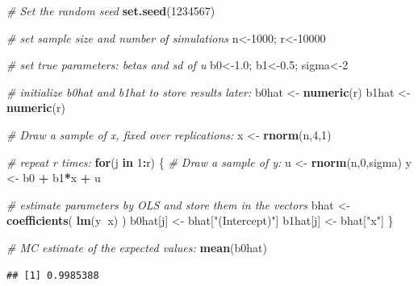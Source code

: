 \documentclass[]{book}
\newenvironment{Shaded}{\begin{snugshade}}{\end{snugshade}}
\newcommand{\CommentTok}[1]{\textcolor[rgb]{0.56,0.35,0.01}{\textit{#1}}}
\newcommand{\ControlFlowTok}[1]{\textcolor[rgb]{0.13,0.29,0.53}{\textbf{#1}}}
\newcommand{\DecValTok}[1]{\textcolor[rgb]{0.00,0.00,0.81}{#1}}
\newcommand{\FloatTok}[1]{\textcolor[rgb]{0.00,0.00,0.81}{#1}}
\newcommand{\KeywordTok}[1]{\textcolor[rgb]{0.13,0.29,0.53}{\textbf{#1}}}
\newcommand{\NormalTok}[1]{#1}
\newcommand{\OperatorTok}[1]{\textcolor[rgb]{0.81,0.36,0.00}{\textbf{#1}}}
\newcommand{\StringTok}[1]{\textcolor[rgb]{0.31,0.60,0.02}{#1}}
\begin{document}
\begin{Shaded}
\begin{Highlighting}[]
\CommentTok{# Set the random seed}
\KeywordTok{set.seed}\NormalTok{(}\DecValTok{1234567}\NormalTok{)}

\CommentTok{# set sample size and number of simulations}
\NormalTok{n<-}\DecValTok{1000}\NormalTok{; r<-}\DecValTok{10000}

\CommentTok{# set true parameters: betas and sd of u}
\NormalTok{b0<-}\FloatTok{1.0}\NormalTok{; b1<-}\FloatTok{0.5}\NormalTok{; sigma<-}\DecValTok{2}

\CommentTok{# initialize b0hat and b1hat to store results later:}
\NormalTok{b0hat <-}\StringTok{ }\KeywordTok{numeric}\NormalTok{(r)}
\NormalTok{b1hat <-}\StringTok{ }\KeywordTok{numeric}\NormalTok{(r)}

\CommentTok{# Draw a sample of x, fixed over replications:}
\NormalTok{x <-}\StringTok{ }\KeywordTok{rnorm}\NormalTok{(n,}\DecValTok{4}\NormalTok{,}\DecValTok{1}\NormalTok{)}

\CommentTok{# repeat r times:}
\ControlFlowTok{for}\NormalTok{(j }\ControlFlowTok{in} \DecValTok{1}\OperatorTok{:}\NormalTok{r) \{}
  \CommentTok{# Draw a sample of y:}
\NormalTok{  u <-}\StringTok{ }\KeywordTok{rnorm}\NormalTok{(n,}\DecValTok{0}\NormalTok{,sigma)}
\NormalTok{  y <-}\StringTok{ }\NormalTok{b0 }\OperatorTok{+}\StringTok{ }\NormalTok{b1}\OperatorTok{*}\NormalTok{x }\OperatorTok{+}\StringTok{ }\NormalTok{u}
  
  \CommentTok{# estimate parameters by OLS and store them in the vectors}
\NormalTok{  bhat <-}\StringTok{ }\KeywordTok{coefficients}\NormalTok{( }\KeywordTok{lm}\NormalTok{(y}\OperatorTok{~}\NormalTok{x) )}
\NormalTok{  b0hat[j] <-}\StringTok{ }\NormalTok{bhat[}\StringTok{"(Intercept)"}\NormalTok{]}
\NormalTok{  b1hat[j] <-}\StringTok{ }\NormalTok{bhat[}\StringTok{"x"}\NormalTok{]}
\NormalTok{\}}
\end{Highlighting}
\end{Shaded}

\begin{Shaded}
\begin{Highlighting}[]
\CommentTok{# MC estimate of the expected values:}
\KeywordTok{mean}\NormalTok{(b0hat)}
\end{Highlighting}
\end{Shaded}

\begin{verbatim}
## [1] 0.9985388
\end{verbatim}
\end{document}
